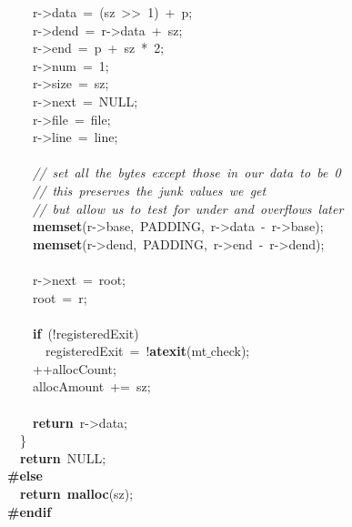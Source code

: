 \documentclass{article}
\begin{document}
\mbox{}\ \ \ \ r-\textgreater{}data\ =\ (sz\ \textgreater{}\textgreater{}\ 1)\ +\ p; \\
\mbox{}\ \ \ \ r-\textgreater{}dend\ =\ r-\textgreater{}data\ +\ sz; \\
\mbox{}\ \ \ \ r-\textgreater{}end\ =\ p\ +\ sz\ *\ 2; \\
\mbox{}\ \ \ \ r-\textgreater{}num\ =\ 1; \\
\mbox{}\ \ \ \ r-\textgreater{}size\ =\ sz; \\
\mbox{}\ \ \ \ r-\textgreater{}next\ =\ NULL; \\
\mbox{}\ \ \ \ r-\textgreater{}file\ =\ file; \\
\mbox{}\ \ \ \ r-\textgreater{}line\ =\ line; \\
\mbox{} \\
\mbox{}\ \ \ \ \textit{//\ set\ all\ the\ bytes\ except\ those\ in\ our\ data\ to\ be\ 0} \\
\mbox{}\ \ \ \ \textit{//\ this\ preserves\ the\ junk\ values\ we\ get} \\
\mbox{}\ \ \ \ \textit{//\ but\ allow\ us\ to\ test\ for\ under\ and\ overflows\ later} \\
\mbox{}\ \ \ \ \textbf{memset}(r-\textgreater{}base,\ PADDING,\ r-\textgreater{}data\ -\ r-\textgreater{}base); \\
\mbox{}\ \ \ \ \textbf{memset}(r-\textgreater{}dend,\ PADDING,\ r-\textgreater{}end\ -\ r-\textgreater{}dend); \\
\mbox{} \\
\mbox{}\ \ \ \ r-\textgreater{}next\ =\ root; \\
\mbox{}\ \ \ \ root\ =\ r; \\
\mbox{} \\
\mbox{}\ \ \ \ \textbf{if}\ (!registeredExit) \\
\mbox{}\ \ \ \ \ \ registeredExit\ =\ !\textbf{atexit}(mt$\_$check); \\
\mbox{}\ \ \ \ ++allocCount; \\
\mbox{}\ \ \ \ allocAmount\ +=\ sz; \\
\mbox{} \\
\mbox{}\ \ \ \ \textbf{return}\ r-\textgreater{}data; \\
\mbox{}\ \ \} \\
\mbox{}\ \ \textbf{return}\ NULL; \\
\mbox{}\textbf{\#else} \\
\mbox{}\ \ \textbf{return}\ \textbf{malloc}(sz); \\
\mbox{}\textbf{\#endif} \\
\end{document}
